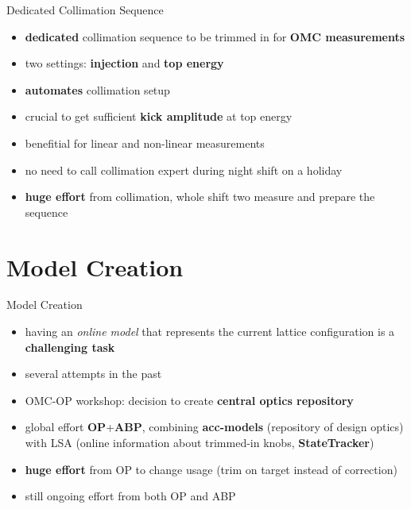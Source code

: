 \documentclass[4pt,usenames,dvipsnames,aspectratio=169,table]{beamer}
\newcommand{\highl}[1]{\textbf{#1}}
\begin{document}
\begin{frame}{Dedicated Collimation Sequence}

    \begin{itemize}
        \item \highl{dedicated} collimation sequence to be trimmed in for \highl{OMC measurements}
        \item two settings: \highl{injection} and \highl{top energy}
        \item \highl{automates} collimation setup
        \item crucial to get sufficient \highl{kick amplitude} at top energy
        \item benefitial for linear and non-linear measurements
        \item no need to call collimation expert during night shift on a holiday
        \item \highl{huge effort} from collimation, whole shift two measure and prepare the sequence
    \end{itemize}

\end{frame}


\section{Model Creation}


\begin{frame}{Model Creation}

\begin{itemize}
    \item having an \emph{online model} that represents the current lattice configuration is a \highl{challenging task}
    \item several attempts in the past
    \item OMC-OP workshop: decision to create \highl{central optics repository}
    \item  global effort \highl{OP}+\highl{ABP}, combining \highl{acc-models} (repository of design optics) with
LSA (online information about trimmed-in knobs, \highl{StateTracker})
    \item \highl{huge effort} from OP to change usage {\footnotesize(trim on target instead of correction)}
    \item still ongoing effort from both OP and ABP
\end{itemize}

\end{frame}
\end{document}
